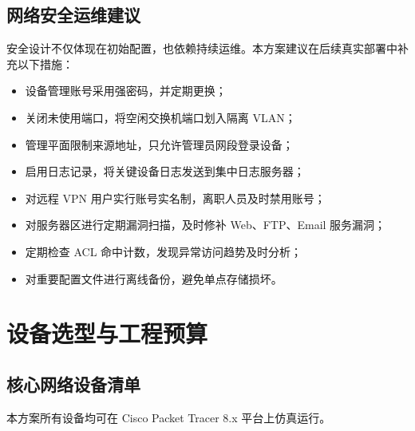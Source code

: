 \documentclass[12pt,a4paper]{ctexart}
\begin{document}
\subsection{网络安全运维建议}

安全设计不仅体现在初始配置，也依赖持续运维。本方案建议在后续真实部署中补充以下措施：

\begin{itemize}
    \item 设备管理账号采用强密码，并定期更换；
    \item 关闭未使用端口，将空闲交换机端口划入隔离 VLAN；
    \item 管理平面限制来源地址，只允许管理员网段登录设备；
    \item 启用日志记录，将关键设备日志发送到集中日志服务器；
    \item 对远程 VPN 用户实行账号实名制，离职人员及时禁用账号；
    \item 对服务器区进行定期漏洞扫描，及时修补 Web、FTP、Email 服务漏洞；
    \item 定期检查 ACL 命中计数，发现异常访问趋势及时分析；
    \item 对重要配置文件进行离线备份，避免单点存储损坏。
\end{itemize}

\section{设备选型与工程预算}

\subsection{核心网络设备清单}

本方案所有设备均可在 Cisco Packet Tracer 8.x 平台上仿真运行。
\end{document}

